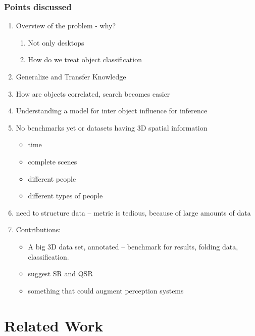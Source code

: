 \documentclass[letterpaper, 10 pt, conference]{ieeeconf}  %
\begin{document}
\subsubsection*{Points discussed}
\begin{enumerate}
	\item Overview of the problem - why?
	\begin{enumerate}
		\item Not only desktops
		\item How do we treat object classification
	\end{enumerate}
	\item Generalize and Transfer Knowledge
	\item How are objects correlated, search becomes easier
	\item Understanding a model for inter object influence for inference
	\item No benchmarks yet or datasets having 3D spatial information
	\begin{itemize}
		\item time
		\item complete scenes
		\item different people
		\item different types of people
	\end{itemize}
	\item need to structure data -- metric is tedious, because of large amounts of data
	\item Contributions:
	\begin{itemize}
		\item A big 3D data set, annotated -- benchmark for results, folding data, classification.
		\item suggest SR and QSR
		\item something that could augment perception systems
	\end{itemize}
\end{enumerate}

\section{Related Work}
\label{sec:Related Work}
\end{document}
